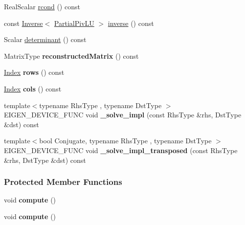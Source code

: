 \begin{DoxyCompactItemize}
\item 
Real\+Scalar \hyperlink{group___l_u___module_a472b46d5d9ff7c328e1dccc13805f690}{rcond} () const
\item 
const \hyperlink{class_eigen_1_1_inverse}{Inverse}$<$ \hyperlink{group___l_u___module_class_eigen_1_1_partial_piv_l_u}{Partial\+Piv\+LU} $>$ \hyperlink{group___l_u___module_aef983470f92aba829e861e32e68681b5}{inverse} () const
\item 
Scalar \hyperlink{group___l_u___module_a12ec1b68b38017fb5d44edcdf890c039}{determinant} () const
\item 
\mbox{\label{group___l_u___module_adc44f38ab3fe0d4fbdd5c1cb00ab2d65}} 
Matrix\+Type {\bfseries reconstructed\+Matrix} () const
\item 
\mbox{\label{group___l_u___module_ad7a86697af02b65b13939d319e1d6840}} 
\hyperlink{group___core___module_a554f30542cc2316add4b1ea0a492ff02}{Index} {\bfseries rows} () const
\item 
\mbox{\label{group___l_u___module_a9aaa1eaccfb6ee5dfab78cb6e190929a}} 
\hyperlink{group___core___module_a554f30542cc2316add4b1ea0a492ff02}{Index} {\bfseries cols} () const
\item 
\mbox{\label{group___l_u___module_ab7e88bbaf3bb0172b9be97036be68999}} 
{\footnotesize template$<$typename Rhs\+Type , typename Dst\+Type $>$ }\\E\+I\+G\+E\+N\+\_\+\+D\+E\+V\+I\+C\+E\+\_\+\+F\+U\+NC void {\bfseries \+\_\+solve\+\_\+impl} (const Rhs\+Type \&rhs, Dst\+Type \&dst) const
\item 
\mbox{\label{group___l_u___module_a6e63a73644ef9fbe7856c8169287c7f5}} 
{\footnotesize template$<$bool Conjugate, typename Rhs\+Type , typename Dst\+Type $>$ }\\E\+I\+G\+E\+N\+\_\+\+D\+E\+V\+I\+C\+E\+\_\+\+F\+U\+NC void {\bfseries \+\_\+solve\+\_\+impl\+\_\+transposed} (const Rhs\+Type \&rhs, Dst\+Type \&dst) const
\end{DoxyCompactItemize}
\subsubsection*{Protected Member Functions}
\begin{DoxyCompactItemize}
\item 
\mbox{\label{group___l_u___module_a8dc40bd1ef7ac09d58587b1b97fca91d}} 
void {\bfseries compute} ()
\item 
\mbox{\label{group___l_u___module_ac9652aa2dc07e53fcbcff20f4829b7ea}} 
void {\bfseries compute} ()
\end{DoxyCompactItemize}
